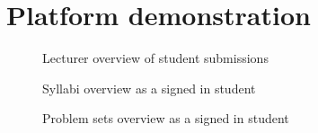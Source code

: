 \chapter{Platform demonstration} \label{chap:images}
\begin{figure}[H]
    \centering
    \caption{Lecturer overview of student submissions}
    \label{fig:teacher_overview.}
\end{figure}

\begin{figure}[H]
    \centering
    \caption{Syllabi overview as a signed in student}
    \label{fig:syllabi}
\end{figure}

\begin{figure}[H]
    \centering
    \caption{Problem sets overview as a signed in student}
    \label{fig:problemsets}
\end{figure}